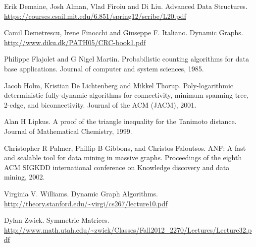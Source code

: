 \documentclass[12pt,a4paper]{article}
\begin{document}
\begin{thebibliography}{100}

    
    Erik Demaine, Josh Alman, Vlad Firoiu and Di Liu.
    \newblock Advanced Data Structures.
    \newblock \url{https://courses.csail.mit.edu/6.851/spring12/scribe/L20.pdf}

    Camil Demetrescu, Irene Finocchi and Giuseppe F. Italiano.
    \newblock Dynamic Graphs.
    \newblock \url{http://www.diku.dk/PATH05/CRC-book1.pdf}

  Philippe Flajolet and G Nigel Martin.
  \newblock Probabilistic counting algorithms for data base applications.
  \newblock Journal of computer and system sciences, 1985.
 


    Jacob Holm,  Kristian De Lichtenberg and Mikkel Thorup.
    \newblock Poly-logarithmic deterministic fully-dynamic algorithms for connectivity, minimum spanning tree, 2-edge, and biconnectivity.
    \newblock Journal of the ACM (JACM), 2001.

  Alan H Lipkus.
  \newblock A proof of the triangle inequality for the Tanimoto distance.
  \newblock Journal of Mathematical Chemistry, 1999.
  

   Christopher R Palmer, Phillip B Gibbons, and Christos Faloutsos.
  \newblock ANF: A fast and scalable tool for data mining in massive graphs.
  \newblock Proceedings of the eighth ACM SIGKDD international conference on Knowledge discovery and data mining, 2002.
    

    
   Virginia V. Williams.
   \newblock Dynamic Graph Algorithms.
    \newblock \url{http://theory.stanford.edu/~virgi/cs267/lecture10.pdf}
    
  Dylan Zwick.
  \newblock Symmetric Matrices.
  \newblock \url{http://www.math.utah.edu/~zwick/Classes/Fall2012_2270/Lectures/Lecture32.pdf}
    
  
\end{thebibliography}
\end{document}

